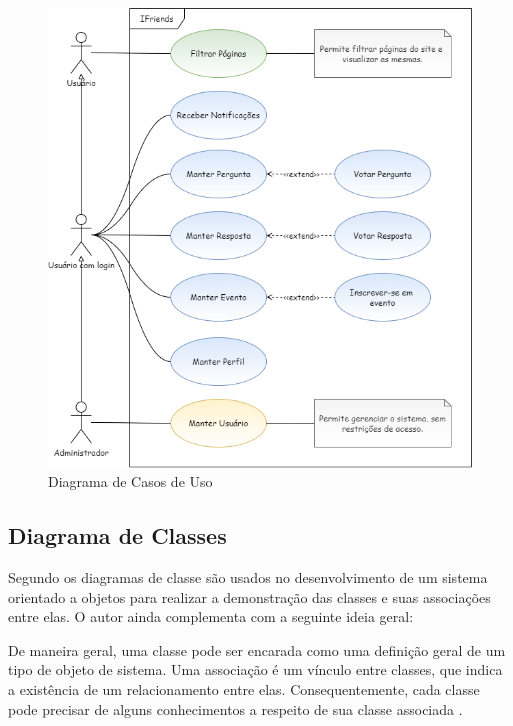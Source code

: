 \begin{figure}[htb]
\centering
\caption{Diagrama de Casos de Uso}
\label{diagrama_CasosUso}
\includegraphics[width=1.0\textwidth]{anexos/Imagens_Diagramas/CasosDeUso_IFriends.png}
\end{figure}
\FloatBarrier

\subsection{Diagrama de Classes}
Segundo  os diagramas de classe são usados no desenvolvimento de um sistema orientado a objetos para realizar a demonstração das classes e suas associações entre elas. O autor ainda complementa com a seguinte ideia geral: 

\begin{citacao}
De maneira geral, uma classe pode ser encarada como uma definição geral de um tipo de objeto de sistema. Uma associação é um vínculo entre classes, que indica a existência de um relacionamento entre elas. Consequentemente, cada classe pode precisar de alguns conhecimentos a respeito de sua classe associada \cite{SOMMERVILLE:2019}. 
\end{citacao}

